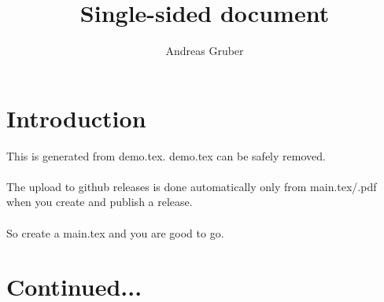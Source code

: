 \documentclass{article}
\begin{document}
\pagestyle{fancy}
\title{Single-sided document}
\author{Andreas Gruber}
\date{}
\fancyhf{} %
\fancyfoot[L]{\thepage}
\fancyfoot[C]{}
\maketitle
\section{Introduction}
This is generated from demo.tex. demo.tex can be safely removed.\\\\
The upload to github releases is done automatically only from main.tex/.pdf when you create and publish a release.\\\\
So create a main.tex and you are good to go.
\newpage
\section{Continued...}
\end{document}
